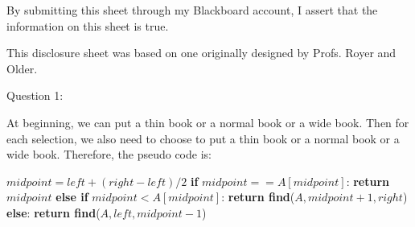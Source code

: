 \documentclass[12pt]{article}
\begin{document}
\vspace*{40ex}

By submitting this sheet through my Blackboard account, I assert that the information on this sheet is true.


\hfill {\tiny This disclosure sheet was based on one originally designed
  by
  Profs. Royer and Older.}


\pagebreak
\noindent
\large Question 1: \vspace{5mm} \par
\normalsize 
At beginning, we can put a thin book or a normal book or a wide book. Then for each selection, we also need to choose to put a thin book or a normal book or a wide book. Therefore, the pseudo code is: \\
\begin{algorithm}
\begin{algorithmic}
  \State \textbf{}$midpoint = left + (right - left) / 2$
  \State \textbf{if} $midpoint == A[midpoint]$:
  \State \hspace{0.8cm}  \textbf{return} $midpoint$
  \State \textbf{else if} $midpoint < A[midpoint]$:
  \State \hspace{0.8cm}  \textbf{return find}($A, midpoint+1, right$)
  \State \textbf{else}:
  \State \hspace{0.8cm} \textbf{return find}($A, left, midpoint-1$)
\EndFunction
\end{algorithmic}
\end{algorithm}\\
\end{document}
